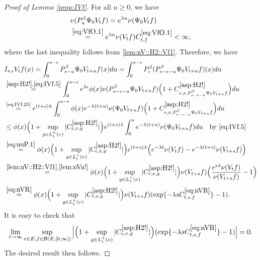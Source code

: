 \documentclass[12pt,a4paper]{amsart}
\numberwithin{equation}{section}
\theoremstyle{plain}
\theoremstyle{definition}
\theoremstyle{remark}
\begin{document}
\begin{proof}[Proof of Lemma \ref{prop:IVf}]
	For all $u\geq 0$, we have
\begin{align} \label{eq:IVf.25}
	&\nu(P_u^\beta \Psi_0 V_t f) = e^{\lambda u}\nu(\Psi_0 V_t f)
	\\&\overset{\eqref{eq:VfO.1}}=e^{\lambda u}\nu(V_tf) C^{\eqref{eq:VfO.1}}_{t,f}
	< \infty, \label{eq:IVf.5}
\end{align}
	where the last inequality follows from \eqref{lem:nV::H2::Vf1}.
	Therefore, we have
\begin{align}
 	& I_{s,\epsilon} V_t f(x)
 	= \int_0^{s- \epsilon} P_{s-u}^\beta \Psi_0 V_{t+u} f (x) du
 	= \int_0^{s- \epsilon} P_\epsilon^\beta (P_{s - \epsilon - u}^\beta \Psi_0 V_{t+u} f )(x) du
 	\\&\overset{\eqref{asp:H2!},\eqref{eq:IVf.5}}= \int_0^{s - \epsilon} e^{\lambda \epsilon} \phi(x) \nu(P_{s - \epsilon - u}^{\beta} \Psi_0 V_{t+u} f)  \Big(1+C^{\eqref{asp:H2!}}_{\epsilon ,x , P_{s - \epsilon - u}^{\beta} \Psi_0 V_{t+u} f}\Big) du
	\\&\overset{\text{\eqref{eq:IVf.25}}}= e^{(t+s)\lambda} \int_0^{s - \epsilon} \phi(x) e^{-\lambda (t+u)}\nu(\Psi_0 V_{t+u} f)  \Big(1+C^{\eqref{asp:H2!}}_{\epsilon ,x , P_{s - \epsilon - u}^{\beta} \Psi_0 V_{t+u} f}\Big) du
	\\&\leq \phi(x) \Big(1+\sup_{g\in L_1^+(\nu)}|C^{\eqref{asp:H2!}}_{\epsilon ,x , g}|\Big) e^{(t+s)\lambda} \int_0^{s} e^{-\lambda (t+u)} \nu(\Psi_0 V_{t+u}f)du\quad\text{by \eqref{eq:IVf.5}}
 	\\&\overset{\eqref{eq:nuP.1}}= \phi(x) \Big(1+\sup_{g\in L_1^+(\nu)}|C^{\eqref{asp:H2!}}_{\epsilon ,x , g}|\Big)  e^{(t+s)\lambda} \Big(e^{-\lambda t}\nu(V_tf)- e^{-\lambda(t+s)}\nu(V_{t+s}f)\Big)
 	\\&\overset{\eqref{lem:nV::H2::Vf1},\eqref{lem:nVn!}}= \phi(x) \Big(1+\sup_{g\in L_1^+(\nu)}|C^{\eqref{asp:H2!}}_{\epsilon ,x , g}|\Big) \nu(V_{t+s}f) \Big( \frac{e^{s \lambda }\nu(V_tf)}{\nu(V_{t+s}f)} - 1\Big)
 	\\&\overset{\eqref{eq:nVR}}= \phi(x) \Big(1+\sup_{g\in L_1^+(\nu)}|C^{\eqref{asp:H2!}}_{\epsilon ,x , g}|\Big) \nu(V_{t+s}f) ( \exp\{- \lambda s C^{\eqref{eq:nVR}}_{t,s,f}\} - 1).
\end{align}
	It is easy to check that
\begin{equation}
	\lim_{t\to \infty}\sup_{x\in E, f\in \mathcal B(E,[0,\infty])}
	\Big|\Big(1+\sup_{g\in L_1^+(\nu)}|C^{\eqref{asp:H2!}}_{\epsilon ,x , g}|\Big)( \exp\{- \lambda s C^{\eqref{eq:nVR}}_{t,s,f}\} - 1) \Big| = 0.
\end{equation}
	The desired result then follows.
\end{proof}
\end{document}

